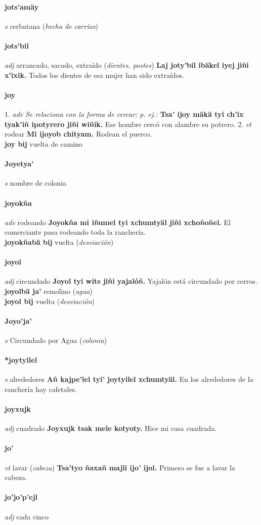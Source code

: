 \documentclass{scrbook}
\newcommand{\entry}[1]{\paragraph{#1}}
\newcommand{\onedefinition}[1]{#1.}
\newcommand{\nontranslationdef}[1]{\textit{#1}}
\newcommand{\partofspeech}[1]{\textit{#1}}
\newcommand{\spanishtranslation}[1]{#1}
\newcommand{\clarification}[1]{(\textit{#1})}
\newcommand{\cholexample}[1]{\textbf{#1}}
\newcommand{\exampletranslation}[1]{#1}
\newcommand{\secondaryentry}[1]{\\\textbf{#1}}
\newcommand{\secondtranslation}[1]{#1}
\begin{document}
\begin{multicols}{2}
\entry{jots'amäy}
\partofspeech{s}
\spanishtranslation{cerbatana}
\clarification{hecha de carrizo}

\entry{jots'bil}
\partofspeech{adj}
\spanishtranslation{arrancado, sacado, extraído}
\clarification{dientes, postes}
\cholexample{Laj joty'bil ibäkel iyej jiñi x'ixik.}
\exampletranslation{Todos los dientes de esa mujer han sido extraídos.}

\entry{joy}
\onedefinition{1}
\partofspeech{adv}
\nontranslationdef{Se relaciona con la forma de cercar; p. ej.:}
\cholexample{Tsa' ijoy mäkä tyi ch'ix tyak'iñ ipotyrero jiñi wiñik.}
\exampletranslation{Ese hombre cercó con alambre su potrero.}
\onedefinition{2}
\partofspeech{vt}
\spanishtranslation{rodear}
\cholexample{Mi ijoyob chityam.}
\exampletranslation{Rodean el puerco.}
\secondaryentry{joy bij}
\secondtranslation{vuelta de camino}

\entry{Joyetya'}
\partofspeech{s}
\spanishtranslation{nombre de colonia}

\entry{joyokña}
\partofspeech{adv}
\spanishtranslation{rodeando}
\cholexample{Joyokña mi iñumel tyi xchumtyäl jiñi xchoñoñel.}
\exampletranslation{El comerciante pasa rodeando toda la ranchería.}
\secondaryentry{joyokñabä bij}
\secondtranslation{vuelta}
\clarification{desviación}

\entry{joyol}
\partofspeech{adj}
\spanishtranslation{circundado}
\cholexample{Joyol tyi wits jiñi yajalóñ.}
\exampletranslation{Yajalón está circundado por cerros.}
\secondaryentry{joyolbä ja'}
\secondtranslation{remolino}
\clarification{agua}
\secondaryentry{joyol bij}
\secondtranslation{vuelta}
\clarification{desviación}

\entry{Joyo'ja'}
\partofspeech{s}
\spanishtranslation{Circundado por Agua}
\clarification{colonia}

\entry{*joytyilel}
\partofspeech{s}
\spanishtranslation{alrededores}
\cholexample{Añ kajpe'lel tyi' joytyilel xchumtyäl.}
\exampletranslation{En los alrededores de la ranchería hay cafetales.}

\entry{joyxujk}
\partofspeech{adj}
\spanishtranslation{cuadrado}
\cholexample{Joyxujk tsak mele kotyoty.}
\exampletranslation{Hice mi casa cuadrada.}

\entry{jo'}
\partofspeech{vt}
\spanishtranslation{lavar}
\clarification{cabeza}
\cholexample{Tsa'tyo ñaxañ majli ijo' ijol.}
\exampletranslation{Primero se fue a lavar la cabeza.}

\entry{jo'jo'p'ejl}
\partofspeech{adj}
\spanishtranslation{cada cinco}


\end{multicols}
\end{document}
